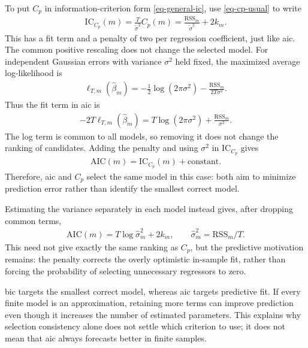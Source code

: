 \documentclass[a4paper,12pt]{article}
\begin{document}
To put $C_p$ in information-criterion form \eqref{eq-general-ic},
use \eqref{eq-cp-usual} to write
\begin{align}
	\mathrm{IC}_{C_p}(m)
	=\frac{T}{\widetilde\sigma^2}C_p(m)
	=\frac{\mathrm{RSS}_m}{\widetilde\sigma^2}+2k_m.
\end{align}
This has a fit term and a penalty of two per regression coefficient, just like \gls{aic}.
The common positive rescaling does not change the selected model.
For independent Gaussian errors with variance $\sigma^2$ held fixed,
the maximized average log-likelihood is
\begin{align}
	\ell_{T,m}(\widehat\beta_m)
	=-\frac12\log(2\pi\sigma^2)-\frac{\mathrm{RSS}_m}{2T\sigma^2}.
\end{align}
Thus the fit term in \gls{aic} is
\begin{align}
	-2T\ell_{T,m}(\widehat\beta_m)
	=T\log(2\pi\sigma^2)+\frac{\mathrm{RSS}_m}{\sigma^2}.
\end{align}
The log term is common to all models, so removing it does not change the ranking of candidates.
Adding the penalty and using $\sigma^2$
in $\mathrm{IC}_{C_p}$ gives
\begin{align}
	\mathrm{AIC}(m)
	=\mathrm{IC}_{C_p}(m)+\text{constant}.
\end{align}
Therefore, \gls{aic} and $C_p$ select the same model in this case:
both aim to minimize prediction error rather than identify the smallest correct model.

\begin{remark}
	Estimating the variance separately in each model instead gives, after dropping common terms,
	\begin{align}\label{eq-regression-ic}
		\mathrm{AIC}(m)=T\log\widehat\sigma_m^2+2k_m,
		\qquad \widehat\sigma_m^2=\mathrm{RSS}_m/T.
	\end{align}
	This need not give exactly the same ranking as $C_p$, but the predictive motivation remains:
	the penalty corrects the overly optimistic in-sample fit,
	rather than forcing the probability of selecting unnecessary regressors to zero.
\end{remark}

\begin{remark}
    \Gls{bic} targets the smallest correct model, whereas \gls{aic} targets predictive fit.
    If every finite model is an approximation, retaining more terms can improve prediction
    even though it increases the number of estimated parameters.
    This explains why selection consistency alone does not settle which criterion to use;
    it does not mean that \gls{aic} always forecasts better in finite samples.
\end{remark}
\end{document}
